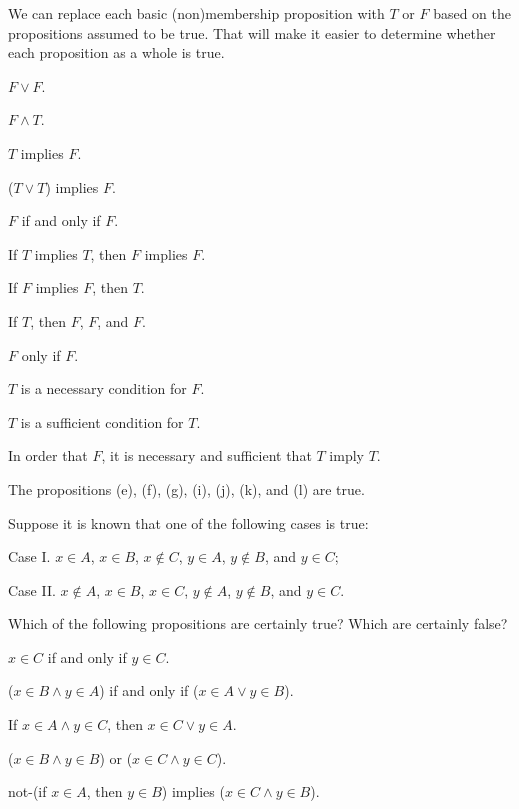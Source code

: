 \begin{solution}
We can replace each basic (non)membership proposition with $T$ or $F$ based on
the propositions assumed to be true. That will make it easier to determine whether
each proposition as a whole is true.
\begin{enumalpha}
    \item $F\lor F$.
    \item $F\land T$.
    \item $T$ implies $F$.
    \item ($T\lor T$) implies $F$.
    \item $F$ if and only if $F$.
    \item If $T$ implies $T$, then $F$ implies $F$.
    \item If $F$ implies $F$, then $T$.
    \item If $T$, then $F$, $F$, and $F$.
    \item $F$ only if $F$.
    \item $T$ is a necessary condition for $F$.
    \item $T$ is a sufficient condition for $T$.
    \item In order that $F$, it is necessary and sufficient that $T$ imply $T$.
\end{enumalpha}
The propositions (e), (f), (g), (i), (j), (k), and (l) are true.
\end{solution}

\begin{exercise}
Suppose it is known that one of the following cases is true:

Case I. $x\in A$, $x\in B$, $x\nin C$, $y\in A$, $y\nin B$, and $y\in C$;

Case II. $x\nin A$, $x\in B$, $x\in C$, $y\nin A$, $y\nin B$, and $y\in C$.

Which of the following propositions are certainly true? Which are certainly false?

\begin{enumalpha}
    \item $x\in C$ if and only if $y\in C$.
    \item ($x\in B\land y\in A$) if and only if ($x\in A\lor y\in B$).
    \item If $x\in A\land y\in C$, then $x\in C\lor y\in A$.
    \item ($x\in B\land y\in B$) or ($x\in C\land y\in C$).
    \item not-(if $x\in A$, then $y\in B$) implies ($x\in C\land y\in B$).
\end{enumalpha}
\end{exercise}

